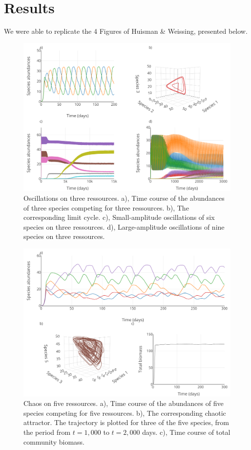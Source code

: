 \section{Results}
We were able to replicate the 4 Figures of Huisman \& Weissing\supercite{1999:Huisman}, presented below. 
\begin{figure}[H]
\begin{center} 
 \includegraphics[width=1\textwidth]{../Code/Figures/Figure_1.pdf}
  \caption{Oscillations on three ressources. a), Time course of the abundances 
of three species competing for three ressources. b), The corresponding limit 
cycle. c), Small-amplitude oscillations of six species on three ressources. 
d), Large-amplitude oscillations of nine species on three ressources.}
  \label{figures:Fig1}
\end{center}
\end{figure}
\begin{figure}[H]
\begin{center} 
 \includegraphics[width=1\textwidth]{../Code/Figures/Figure_2.pdf}
  \caption{Chaos on five ressources. a), Time course of the abundances of five 
species competing for five ressources. b), The corresponding chaotic attractor. 
The trajectory is plotted for three of the five species, from the period from 
$t= 1,000$ to $t=2,000$ days. c), Time course of total community biomass.}
  \label{figures:Fig2}
\end{center}
\end{figure}
